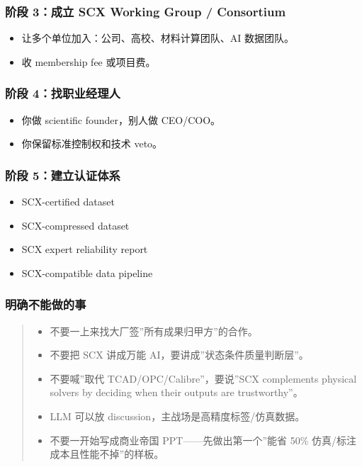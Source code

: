 \documentclass[
  12pt,
]{ctexart}
\providecommand{\tightlist}{%
  \setlength{\itemsep}{0pt}\setlength{\parskip}{0pt}}
\begin{document}
\subsubsection{阶段 3：成立 SCX Working Group /
Consortium}\label{ux9636ux6bb5-3ux6210ux7acb-scx-working-group-consortium}

\begin{itemize}
\tightlist
\item
  让多个单位加入：公司、高校、材料计算团队、AI 数据团队。
\item
  收 membership fee 或项目费。
\end{itemize}

\subsubsection{阶段
4：找职业经理人}\label{ux9636ux6bb5-4ux627eux804cux4e1aux7ecfux7406ux4eba}

\begin{itemize}
\tightlist
\item
  你做 scientific founder，别人做 CEO/COO。
\item
  你保留标准控制权和技术 veto。
\end{itemize}

\subsubsection{阶段
5：建立认证体系}\label{ux9636ux6bb5-5ux5efaux7acbux8ba4ux8bc1ux4f53ux7cfb}

\begin{itemize}
\tightlist
\item
  SCX-certified dataset
\item
  SCX-compressed dataset
\item
  SCX expert reliability report
\item
  SCX-compatible data pipeline
\end{itemize}

\subsubsection{明确不能做的事}\label{ux660eux786eux4e0dux80fdux505aux7684ux4e8b}

\begin{quote}
\begin{itemize}
\tightlist
\item
  不要一上来找大厂签''所有成果归甲方''的合作。
\item
  不要把 SCX 讲成万能 AI，要讲成''状态条件质量判断层''。
\item
  不要喊''取代 TCAD/OPC/Calibre''，要说''SCX complements physical
  solvers by deciding when their outputs are trustworthy''。
\item
  LLM 可以放 discussion，主战场是高精度标签/仿真数据。
\item
  不要一开始写成商业帝国 PPT------先做出第一个''能省 50\%
  仿真/标注成本且性能不掉''的样板。
\end{itemize}
\end{quote}
\end{document}
